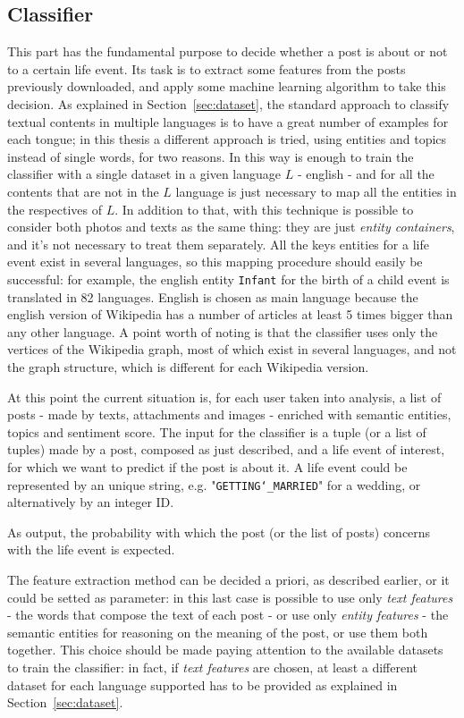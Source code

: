 \subsection{Classifier}
This part has the fundamental purpose to decide whether a post is about or not to a certain life event. Its task is to extract some features from the posts previously downloaded, and apply some machine learning algorithm to take this decision. As explained in Section~\ref{sec:dataset}, the standard approach to classify textual contents in multiple languages is to have a great number of examples for each tongue; in this thesis a different approach is tried, using entities and topics instead of single words, for two reasons. In this way is enough to train the classifier with a single dataset in a given language $ L $ - english - and for all the contents that are not in the $ L $ language is just necessary to map all the entities in the respectives of $L$. In addition to that, with this technique is possible to consider both photos and texts as the same thing: they are just \emph{entity containers}, and it's not necessary to treat them separately. All the keys entities for a life event exist in several languages, so this mapping procedure should easily be successful: for example, the english entity \texttt{Infant} for the birth of a child event is translated in 82 languages. English is chosen as main language because the english version of Wikipedia has a number of articles at least 5 times bigger than any other language. A point worth of noting is that the classifier uses only the vertices of the Wikipedia graph, most of which exist in several languages, and not the graph structure, which is different for each Wikipedia version.

At this point the current situation is, for each user taken into analysis, a list of posts - made by texts, attachments and images - enriched with semantic entities, topics and sentiment score. The input for the classifier is a tuple (or a list of tuples) made by a post, composed as just described, and a life event of interest, for which we want to predict if the post is about it. A life event could be represented by an unique string, e.g. "\texttt{GETTING\char`_MARRIED}" for a wedding, or alternatively by an integer ID.

As output, the probability with which the post (or the list of posts) concerns with the life event is expected.

The feature extraction method can be decided a priori, as described earlier, or it could be setted as parameter: in this last case is possible to use only \emph{text features} - the words that compose the text of each post - or use only \emph{entity features} - the semantic entities for reasoning on the meaning of the post, or use them both together. This choice should be made paying attention to the available datasets to train the classifier: in fact, if \emph{text features} are chosen, at least a different dataset for each language supported has to be provided as explained in Section~\ref{sec:dataset}.

